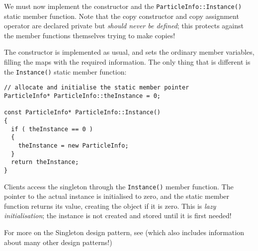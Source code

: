 \documentclass[a4paper]{scrartcl}
\begin{document}
We must now implement the constructor and the \verb|ParticleInfo::Instance()| static member function. Note that the copy constructor and copy assignment operator are declared private but \emph{should never be defined}; this protects against the member functions themselves trying to make copies!

The constructor is implemented as usual, and sets the ordinary member variables, filling the maps with the required information. The only thing that is different is the \verb|Instance()| static member function:

\begin{verbatim}
// allocate and initialise the static member pointer
ParticleInfo* ParticleInfo::theInstance = 0;

const ParticleInfo* ParticleInfo::Instance()
{
  if ( theInstance == 0 )
  {
    theInstance = new ParticleInfo;
  }
  return theInstance;
}
\end{verbatim}

Clients access the singleton through the \verb|Instance()| member function. The pointer to the actual instance is initialised to zero, and the static member function returns its value, creating the object if it is zero. This is \emph{lazy initialisation}; the instance is not created and stored until it is first needed!

For more on the Singleton design pattern, see\cite{DesignPatterns} (which also includes information about many other design patterns!)


\end{document}
